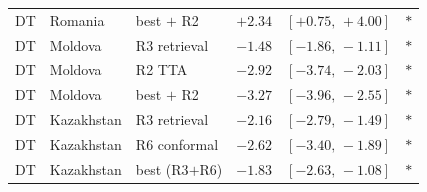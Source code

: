 \begin{table}[!htb]
\begin{tabular}{l l l r r c}
DT & Romania    & best $+$ R2           & $+2.34$ & $[+0.75,\,+4.00]$ & $\ast$ \\
DT & Moldova    & R3 retrieval          & $-1.48$ & $[-1.86,\,-1.11]$ & $\ast$ \\
DT & Moldova    & R2 TTA                & $-2.92$ & $[-3.74,\,-2.03]$ & $\ast$ \\
DT & Moldova    & best $+$ R2           & $-3.27$ & $[-3.96,\,-2.55]$ & $\ast$ \\
DT & Kazakhstan & R3 retrieval          & $-2.16$ & $[-2.79,\,-1.49]$ & $\ast$ \\
DT & Kazakhstan & R6 conformal          & $-2.62$ & $[-3.40,\,-1.89]$ & $\ast$ \\
DT & Kazakhstan & best (R3$+$R6)        & $-1.83$ & $[-2.63,\,-1.08]$ & $\ast$ \\
\bottomrule
\end{tabular}
\end{table}
